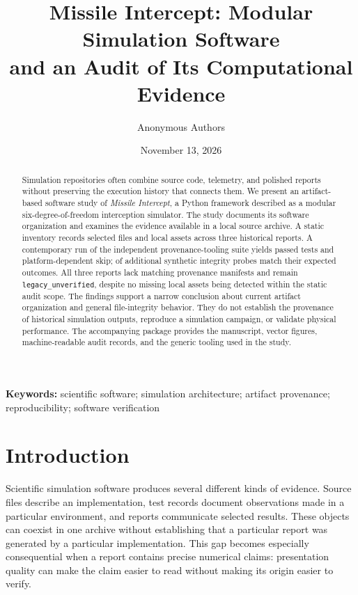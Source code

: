 \documentclass[11pt,a4paper]{article}
\title{\vspace{-1.2em}\textbf{Missile Intercept: Modular Simulation Software\\and an Audit of Its Computational Evidence}}
\author{Anonymous Authors}
\date{November 13, 2026}
\newcommand{\code}[1]{\texttt{#1}}
\begin{document}
\maketitle
\thispagestyle{plain}

\begin{abstract}
Simulation repositories often combine source code, telemetry, and polished reports without preserving the execution history that connects them. We present an artifact-based software study of \emph{Missile Intercept}, a Python framework described as a modular six-degree-of-freedom interception simulator. The study documents its software organization and examines the evidence available in a local source archive. A static inventory records \SelectedFiles selected files and \ReportAssets local assets across three historical reports. A contemporary run of the independent provenance-tooling suite yields \TestsPassed passed tests and \TestsSkipped platform-dependent skip; \ProbesMet of \ProbeCount additional synthetic integrity probes match their expected outcomes. All three reports lack matching provenance manifests and remain \code{legacy\_unverified}, despite no missing local assets being detected within the static audit scope. The findings support a narrow conclusion about current artifact organization and general file-integrity behavior. They do not establish the provenance of historical simulation outputs, reproduce a simulation campaign, or validate physical performance. The accompanying package provides the manuscript, vector figures, machine-readable audit records, and the generic tooling used in the study.
\end{abstract}

\noindent\textbf{Keywords:} scientific software; simulation architecture; artifact provenance; reproducibility; software verification

\section{Introduction}
Scientific simulation software produces several different kinds of evidence. Source files describe an implementation, test records document observations made in a particular environment, and reports communicate selected results. These objects can coexist in one archive without establishing that a particular report was generated by a particular implementation. This gap becomes especially consequential when a report contains precise numerical claims: presentation quality can make the claim easier to read without making its origin easier to verify.
\end{document}
